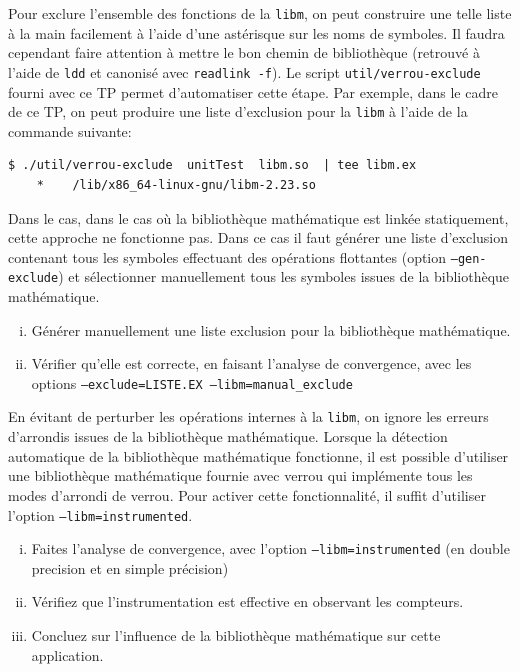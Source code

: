 \documentclass[a4paper]{article}
\newenvironment{commandline}{
  \begin{mdframed}[style=commandline]
}{
  \end{mdframed}
}
\newcounter{Question}
\newenvironment{question}[1][\unskip]{
  \bigskip
  \stepcounter{Question}
  \def\questionTitle{ #1}
  \begin{mdframed}[style=question]
  }{
  \end{mdframed}
}
\begin{document}
Pour exclure l'ensemble des fonctions de la \texttt{libm}, on peut construire
une telle liste à la main facilement à l'aide d'une astérisque sur les noms de
symboles. Il faudra cependant faire attention à mettre le bon chemin de
bibliothèque (retrouvé à l'aide de \texttt{ldd} et canonisé avec
\texttt{readlink -f}). Le script \texttt{util/verrou-exclude} fourni avec ce TP
permet d'automatiser cette étape. Par exemple, dans le cadre de ce TP, on peut
produire une liste d'exclusion pour la \texttt{libm} à l'aide de la commande
suivante:
\begin{commandline}
\begin{verbatim}
$ ./util/verrou-exclude  unitTest  libm.so  | tee libm.ex
    *    /lib/x86_64-linux-gnu/libm-2.23.so
\end{verbatim}
\end{commandline}

Dans le cas, dans le cas où la bibliothèque mathématique est linkée statiquement, cette approche ne fonctionne pas. Dans ce cas
il faut générer une liste d'exclusion contenant tous les symboles effectuant des opérations flottantes (option \texttt{--gen-exclude})
et sélectionner manuellement tous les symboles issues de la bibliothèque mathématique.


\begin{question}
  \begin{enumerate}[(i)]
  \item Générer manuellement une liste exclusion pour la bibliothèque mathématique.
  \item Vérifier qu'elle est correcte, en faisant l'analyse de convergence, avec les options \texttt{--exclude=LISTE.EX  --libm=manual\_exclude}
  \end{enumerate}
\end{question}

\bigskip
En évitant de perturber les opérations internes à la
\texttt{libm}, on ignore les erreurs d'arrondis issues de la
bibliothèque mathématique. Lorsque la détection automatique de la
bibliothèque mathématique fonctionne, il est possible d'utiliser une
bibliothèque mathématique fournie avec verrou qui implémente tous les
modes d'arrondi de verrou. Pour activer cette fonctionnalité, il
suffit d'utiliser l'option \texttt{--libm=instrumented}. 


\begin{question}
  \begin{enumerate}[(i)]
  \item Faites l'analyse de convergence, avec l'option \texttt{--libm=instrumented} (en double precision et en simple précision)
  \item Vérifiez que l'instrumentation est effective en observant les compteurs.
  \item Concluez sur l'influence de la bibliothèque mathématique sur cette application.
  \end{enumerate}
\end{question}
\end{document}
